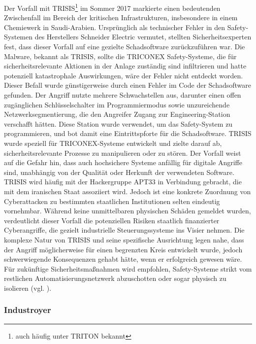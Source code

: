 Der Vorfall mit TRISIS\footnote{auch häufig unter TRITON bekannt} im Sommer 2017 markierte einen bedeutenden Zwischenfall im Bereich der kritischen Infrastrukturen, insbesondere in einem Chemiewerk in Saudi-Arabien. Ursprünglich als technischer Fehler in den Safety-Systemen des Herstellers Schneider Electric vermutet, stellten Sicherheitsexperten fest, dass dieser Vorfall auf eine gezielte Schadsoftware zurückzuführen war. Die Malware, bekannt als TRISIS, sollte die TRICONEX Safety-Systeme, die für sicherheitsrelevante Aktionen in der Anlage zuständig sind infiltrieren und hatte potenziell katastrophale Auswirkungen, wäre der Fehler nicht entdeckt worden. Dieser Befall wurde günstigerweise durch einen Fehler im Code der Schadsoftware gefunden. Der Angriff nutzte mehrere Schwachstellen aus, darunter einen offen zugänglichen Schlüsselschalter im Programmiermodus sowie unzureichende Netzwerksegmentierung, die den Angreifer Zugang zur Engineering-Station verschafft hätten. Diese Station wurde verwendet, um das Safety-System zu programmieren, und bot damit eine Eintrittspforte für die Schadsoftware. TRISIS wurde speziell für TRICONEX-Systeme entwickelt und zielte darauf ab, sicherheitsrelevante Prozesse zu manipulieren oder zu stören. Der Vorfall weist auf die Gefahr hin, dass auch hochsichere Systeme anfällig für digitale Angriffe sind, unabhängig von der Qualität oder Herkunft der verwendeten Software. TRISIS wird häufig mit der Hackergruppe APT33 in Verbindung gebracht, die mit dem iranischen Staat assoziiert wird. Jedoch ist eine konkrete Zuordnung von Cyberattacken zu bestimmten staatlichen Institutionen selten eindeutig vornehmbar. Während keine unmittelbaren physischen Schäden gemeldet wurden, verdeutlicht dieser Vorfall die potenziellen Risiken staatlich finanzierter Cyberangriffe, die gezielt industrielle Steuerungssysteme ins Visier nehmen. Die komplexe Natur von TRISIS und seine spezifische Ausrichtung legen nahe, dass der Angriff möglicherweise für einen begrenzten Kreis entwickelt wurde, jedoch schwerwiegende Konsequenzen gehabt hätte, wenn er erfolgreich gewesen wäre. Für zukünftige Sicherheitsmaßnahmen wird empfohlen, Safety-Systeme strikt vom restlichen Automatisierungsnetzwerk abzuschotten oder sogar physisch zu isolieren (vgl. \cite{TRISIS}).

\subsubsection{Industroyer}

